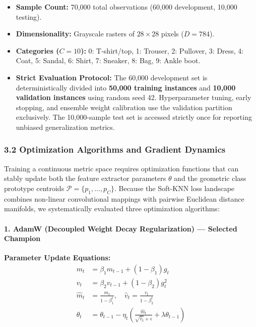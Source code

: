 \begin{itemize}
\tightlist
\item
  \textbf{Sample Count:} 70,000 total observations (60,000 development,
  10,000 testing).
\item
  \textbf{Dimensionality:} Grayscale rasters of \(28 \times 28\) pixels
  (\(D = 784\)).
\item
  \textbf{Categories (\(C=10\)):} 0: T-shirt/top, 1: Trouser, 2:
  Pullover, 3: Dress, 4: Coat, 5: Sandal, 6: Shirt, 7: Sneaker, 8: Bag,
  9: Ankle boot.
\item
  \textbf{Strict Evaluation Protocol:} The 60,000 development set is
  deterministically divided into \textbf{50,000 training instances} and
  \textbf{10,000 validation instances} using random seed 42.
  Hyperparameter tuning, early stopping, and ensemble weight calibration
  use the validation partition exclusively. The 10,000-sample test set
  is accessed strictly once for reporting unbiased generalization
  metrics.
\end{itemize}

\subsubsection{3.2 Optimization Algorithms and Gradient
Dynamics}\label{32-optimization-algorithms-and-gradient-dynamics}

Training a continuous metric space requires optimization functions that
can stably update both the feature extractor parameters \(\theta\) and
the geometric class prototype centroids
\(\mathcal{P} = \{p_1, \dots, p_C\}\). Because the Soft-KNN loss
landscape combines non-linear convolutional mappings with pairwise
Euclidean distance manifolds, we systematically evaluated three
optimization algorithms:

\paragraph{1. AdamW (Decoupled Weight Decay Regularization) --- Selected
Champion}\label{1-adamw-decoupled-weight-decay-regularization--selected-champion}

\textbf{Parameter Update Equations:} \[
\begin{aligned}
m_t &= \beta_1 m_{t-1} + (1 - \beta_1) g_t \\
v_t &= \beta_2 v_{t-1} + (1 - \beta_2) g_t^2 \\
\hat{m}_t &= \frac{m_t}{1 - \beta_1^t}, \quad \hat{v}_t = \frac{v_t}{1 - \beta_2^t} \\
\theta_t &= \theta_{t-1} - \eta_t \left( \frac{\hat{m}_t}{\sqrt{\hat{v}_t} + \epsilon} + \lambda \theta_{t-1} \right)
\end{aligned}
\]

